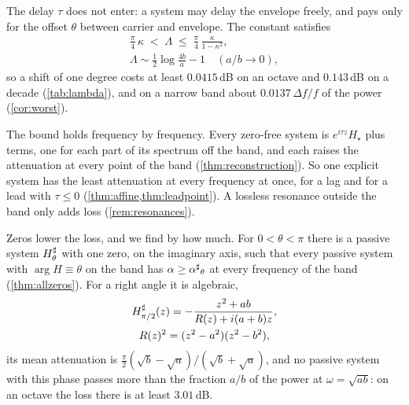 The delay $\tau$ does not enter: a system may delay the envelope freely, and
pays only for the offset $\theta$ between carrier and envelope. The constant
satisfies
\begin{equation}\label{eq:intro-bounds}
\begin{gathered}
\frac\pi4\,\kappa\;<\;\Lambda\;\le\;\frac\pi4\,\frac{\kappa}{1-\kappa^2},\\
\Lambda\sim\tfrac12\log\frac{4b}{a}-1\quad(a/b\to0),
\end{gathered}
\end{equation}
so a shift of one degree costs at least $0.0415$\,dB on an octave and
$0.143$\,dB on a decade (\cref{tab:lambda}), and on a narrow band about
$0.0137\,\Delta f/f$ of the power (\cref{cor:worst}).

The bound holds frequency by frequency. Every zero-free system is
$e^{i\tau z}H_\star$ plus terms, one for each part of its spectrum off the
band, and each raises the attenuation at every point of the band
(\cref{thm:reconstruction}). So one explicit system has the least
attenuation at every frequency at once, for a lag and for a lead with
$\tau\le0$ (\cref{thm:affine,thm:leadpoint}). A lossless resonance outside the band only
adds loss (\cref{rem:resonances}).

Zeros lower the loss, and we find by how much. For $0<\theta<\pi$ there is a
passive system $H^{\sharp}_\theta$ with one zero, on the imaginary axis, such that
every passive system with $\arg H\equiv\theta$ on the band has
$\alpha\ge{\alpha^{\sharp}}_\theta$ at every frequency of the band (\cref{thm:allzeros}). For
a right angle it is algebraic,
\begin{gather*}
H^{\sharp}_{\pi/2}(z)=-\frac{z^2+ab}{R(z)+i(a+b)z},\\
R(z)^2=(z^2-a^2)(z^2-b^2),
\end{gather*}
its mean attenuation is $\frac\pi2(\sqrt b-\sqrt a)/(\sqrt b+\sqrt a)$, and no
passive system with this phase passes more than the fraction $a/b$ of the
power at $\omega=\sqrt{ab}$: on an octave the loss there is at least
$3.01$\,dB.

